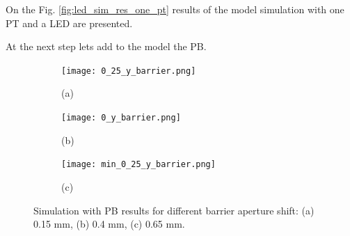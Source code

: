 On the Fig. \ref{fig:led_sim_res_one_pt} results of the model simulation with one PT and a LED are presented.

At the next step lets add to the model the PB.




\begin{figure}[H]

\end{figure}

\begin{figure}[H]
  \centering
  \begin{subfigure}[b]{0.3\textwidth}
    \texttt{[image: 0\_25\_y\_barrier.png]}
    \centering
    \label{fig:0_25_y_barrier}
    \caption*{(a)}
  \end{subfigure}
  \begin{subfigure}[b]{0.3\textwidth}
    \texttt{[image: 0\_y\_barrier.png]}
    \label{fig:0_y_barrier}
    \caption*{(b)}
  \end{subfigure}
  \begin{subfigure}[b]{0.3\textwidth}
    \texttt{[image: min\_0\_25\_y\_barrier.png]}
    \label{fig:min_0_25_y_barrier}
    \caption*{(c)}
  \end{subfigure}
  \caption{Simulation with PB results for different barrier aperture shift: (a) 0.15 mm, (b) 0.4 mm, (c) 0.65 mm.}
  \label{fig:LED_PT_sim_bar}
\end{figure}

    
    



